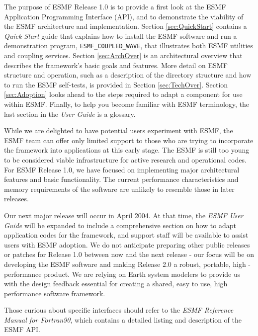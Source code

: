 The purpose of ESMF Release 1.0 is to provide a first look at the ESMF
Application Programming Interface (API), and to demonstrate the viability 
of the ESMF architecture and implementation.  Section \ref{sec:QuickStart} contains 
a {\it Quick Start} guide that explains how to install the ESMF software and 
run a demonstration program, {\tt ESMF\_COUPLED\_WAVE}, that illustrates both ESMF 
utilities and coupling services.  Section \ref{sec:ArchOver} is an 
architectural overview that describes the framework's basic goals and features.  
More detail on ESMF structure and operation, such as a description of the 
directory structure and how to run the ESMF self-tests, is provided in Section 
\ref{sec:TechOver}.  Section \ref{sec:Adoption} looks ahead to the steps 
required to adapt a component for use within ESMF.  Finally, to help you become 
familiar with ESMF terminology, the last section in the {\it User Guide} is 
a glossary.  

While we are delighted to have potential users experiment with ESMF, the
ESMF team can offer only limited support to those who are trying to incorporate 
the framework into applications at this early stage.  The ESMF is still
too young to be considered viable infrastructure for active research and 
operational codes.  For ESMF Release 1.0, we have focused on implementing 
major architectural features and basic functionality.  The current performance 
characteristics and memory requirements of the software are unlikely to resemble 
those in later releases.

Our next major release will occur in April 2004.  At that time, the {\it ESMF 
User Guide} will be expanded to include a comprehensive section on how to adapt 
application codes for the framework, and support staff will be available to 
assist users with ESMF adoption.  We do not anticipate preparing other public
releases or patches for Release 1.0 between now and the next release - our focus
will be on developing the ESMF software and making Release 2.0 a robust, portable,
high -performance product.  We are relying on Earth system modelers to provide 
us with the design feedback essential for creating a shared, easy to use, high 
performance software framework.  

Those curious about specific interfaces should refer to the {\it ESMF Reference 
Manual for Fortran90}, which contains a detailed listing and description of 
the ESMF API.


















